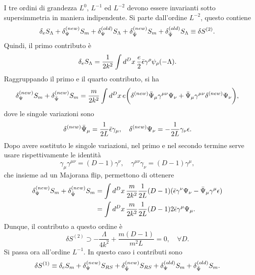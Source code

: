 I tre ordini di grandezza $L^0$, $L^{-1}$ ed $L^{-2}$ devono essere invarianti sotto supersimmetria in maniera indipendente. Si parte dall'ordine $L^{-2}$, questo contiene 
\begin{equation}
    \delta_eS_\Lambda + \delta_\Psi^{(new)}S_m + \delta_\Psi^{(old)}S_\Lambda +\delta_{\bar{\Psi}}^{(new)}S_m +\delta_{\bar{\Psi}}^{(old)}S_\Lambda \equiv \delta S^{(2)}.
\end{equation}
Quindi, il primo contributo è
\begin{equation}
    \delta_eS_\Lambda = \frac{1}{2k^2}\int d^Dx\,\frac{e}{2}\bar{\epsilon}\gamma^\rho\psi_\rho(-\Lambda).
\end{equation}
Raggruppando il primo e il quarto contributo, si ha 
\begin{equation}
    \delta_\Psi^{(new)}S_m + \delta_{\bar{\Psi}}^{(new)}S_m = \frac{m}{2k^2}\int d^Dx\,e\bigg(\delta^{(new)}\bar{\Psi}_\mu\gamma^{\mu\nu}\Psi_\nu + \bar{\Psi}_\mu\gamma^{\mu\nu}\delta^{(new)}\Psi_\nu\bigg),
\end{equation}
dove le singole variazioni sono
\begin{equation}
    \delta^{(new)}\bar{\Psi}_\mu = \frac{1}{2L}\bar{\epsilon}\gamma_\mu,\quad \delta^{(new)}\Psi_\nu = -\frac{1}{2L}\gamma_\nu\epsilon.
\end{equation}
Dopo avere sostituto le singole variazioni, nel primo e nel secondo termine serve usare rispettivamente le identità
\begin{equation}
    \gamma_\mu\gamma^{\mu\nu} = (D - 1)\gamma^\nu,\quad \gamma^{\mu\nu}\gamma_\nu = (D - 1)\gamma^\mu,
\end{equation}
che insieme ad un Majorana flip, permettono di ottenere
\begin{equation}
    \begin{split}
        \delta_\Psi^{(new)}S_m + \delta_{\bar{\Psi}}^{(new)}S_m &= \int d^Dx\,\frac{m}{2k^2}\frac{1}{2L}(D - 1)(\bar{\epsilon}\gamma^\nu\Psi_\nu - \bar{\Psi}_\mu\gamma^\mu\epsilon) \\
        &= \int d^Dx\,\frac{m}{2k^2}\frac{1}{2L}(D - 1)2\bar{\epsilon}\gamma^\mu\Psi_\mu.
    \end{split}
\end{equation}
Dunque, il contributo a questo ordine è 
\begin{equation}
    \delta S^{(2)} \supset -\frac{\Lambda}{4k^2} + \frac{m(D - 1)}{m^2L} = 0,\quad \forall D.
\end{equation}
Si passa ora all'ordine $L^{-1}$. In questo caso i contributi sono 
\begin{equation}
    \delta S^{(1)} \equiv \delta_eS_m + \delta_{\Psi}^{(new)}S_{RS} + \delta_{\bar{\Psi}}^{(new)}S_{RS} + \delta_\Psi^{(old)}S_m + \delta_{\bar{\Psi}}^{(old)}S_m.
\end{equation}
